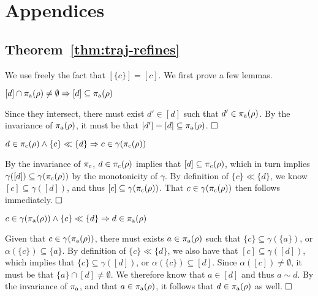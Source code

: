 \section{Appendices}

\subsection{Theorem~\ref{thm:traj-refines}}

We use freely the fact that $[\{ c \}] = [c]$. We first prove a few lemmas.

\begin{lemma} \label{lem:class-sub}
$[d] \cap \operatorname{\pi_{\textrm{a}}}(\rho) \neq \emptyset \Rightarrow [d] \subseteq \operatorname{\pi_{\textrm{a}}}(\rho)$
\end{lemma}

Since they intersect, there must exist $d' \in [d]$ such that $d' \in \operatorname{\pi_{\textrm{a}}}(\rho)$. By the invariance of $\operatorname{\pi_{\textrm{a}}}(\rho)$, it must be that $[d'] = [d] \subseteq \operatorname{\pi_{\textrm{a}}}(\rho)$. $\qedbox$

\begin{lemma} \label{lem:traj-con}
$d \in \operatorname{\pi_{\textrm{c}}}(\rho) \wedge \{ c \} \ll \{ d \} \Rightarrow c \in \gamma(\operatorname{\pi_{\textrm{c}}}(\rho))$
\end{lemma}

By the invariance of $\operatorname{\pi_{\textrm{c}}}$, $d \in \operatorname{\pi_{\textrm{c}}}(\rho)$ implies that $[d] \subseteq \operatorname{\pi_{\textrm{c}}}(\rho)$, which in turn implies $\gamma([d]) \subseteq \gamma(\operatorname{\pi_{\textrm{c}}}(\rho))$ by the monotonicity of $\gamma$. By definition of $\{ c \} \ll \{ d \}$, we know $[c] \subseteq \gamma([d])$, and thus $[c] \subseteq \gamma(\operatorname{\pi_{\textrm{c}}}(\rho))$. That $c \in \gamma(\operatorname{\pi_{\textrm{c}}}(\rho))$ then follows immediately. $\qedbox$

\begin{lemma} \label{lem:traj-ant}
$c \in \gamma(\operatorname{\pi_{\textrm{a}}}(\rho)) \wedge \{ c \} \ll \{ d \} \Rightarrow d \in \operatorname{\pi_{\textrm{a}}}(\rho)$
\end{lemma}

Given that $c \in \gamma(\operatorname{\pi_{\textrm{a}}}(\rho))$, there must exists $a \in \operatorname{\pi_{\textrm{a}}}(\rho)$ such that $\{ c \} \subseteq \gamma(\{ a \})$, or $\alpha(\{ c \}) \subseteq \{ a \}$. By definition of $\{ c \} \ll \{ d \}$, we also have that $[c] \subseteq \gamma([d])$, which implies that $\{ c \} \subseteq \gamma([d])$, or $\alpha(\{ c \}) \subseteq [d]$. Since $\alpha([c]) \neq \emptyset$, it must be that $\{ a \} \cap [d] \neq \emptyset$. We therefore know that $a \in [d]$ and thus $a \sim d$. By the invariance of $\operatorname{\pi_{\textrm{a}}}$, and that $a \in \operatorname{\pi_{\textrm{a}}}(\rho)$, it follows that $d \in \operatorname{\pi_{\textrm{a}}}(\rho)$ as well. $\qedbox$
\\

